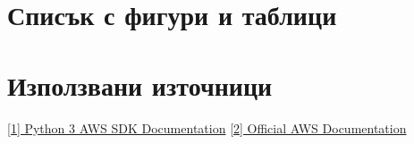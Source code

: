 \documentclass[12pt]{article}
\begin{document}
\section{Списък с фигури и таблици}

\listoftables

\listoffigures

\section{Използвани източници}

\noindent\href{https://boto3.amazonaws.com/v1/documentation/api/latest/index.html}{[1] Python 3 AWS SDK Documentation}
\noindent\href{https://docs.aws.amazon.com/}{[2] Official AWS Documentation}

\medskip


\bigskip
\end{document}
